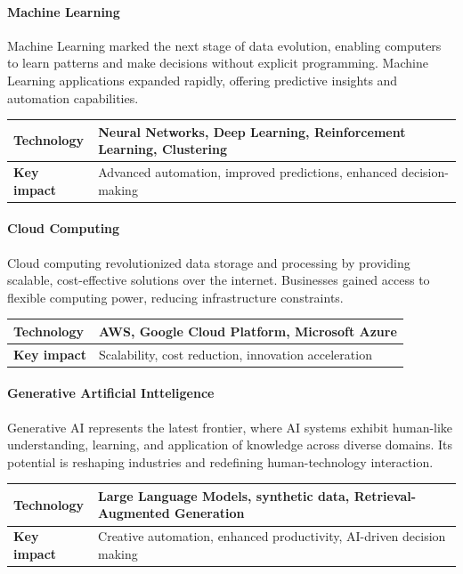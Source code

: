 \paragraph*{Machine Learning}
Machine Learning marked the next stage of data evolution, enabling computers to learn patterns and make decisions without explicit programming. 
Machine Learning applications expanded rapidly, offering predictive insights and automation capabilities.
\renewcommand*{\arraystretch}{1.5}
\begin{table}[H]
    \centering
    \begin{tabular}{|l|l|}
    \hline
    \textbf{Technology} & Neural Networks, Deep Learning, Reinforcement Learning, Clustering                                  \\ \hline
    \textbf{Key impact} & Advanced automation, improved predictions, enhanced decision-making \\ \hline
    \end{tabular}
\end{table}
\renewcommand*{\arraystretch}{1}

\paragraph*{Cloud Computing}
Cloud computing revolutionized data storage and processing by providing scalable, cost-effective solutions over the internet. 
Businesses gained access to flexible computing power, reducing infrastructure constraints.
\renewcommand*{\arraystretch}{1.5}
\begin{table}[H]
    \centering
    \begin{tabular}{|l|l|}
    \hline
    \textbf{Technology} & AWS, Google Cloud Platform, Microsoft Azure                                 \\ \hline
    \textbf{Key impact} & Scalability, cost reduction, innovation acceleration \\ \hline
    \end{tabular}
\end{table}
\renewcommand*{\arraystretch}{1}

\paragraph*{Generative Artificial Intteligence}
Generative AI represents the latest frontier, where AI systems exhibit human-like understanding, learning, and application of knowledge across diverse domains.
Its potential is reshaping industries and redefining human-technology interaction.
\renewcommand*{\arraystretch}{1.5}
\begin{table}[H]
    \centering
    \begin{tabular}{|l|l|}
    \hline
    \textbf{Technology} & Large Language Models, synthetic data, Retrieval-Augmented Generation                                 \\ \hline
    \textbf{Key impact} & Creative automation, enhanced productivity, AI-driven decision making \\ \hline
    \end{tabular}
\end{table}
\renewcommand*{\arraystretch}{1}

